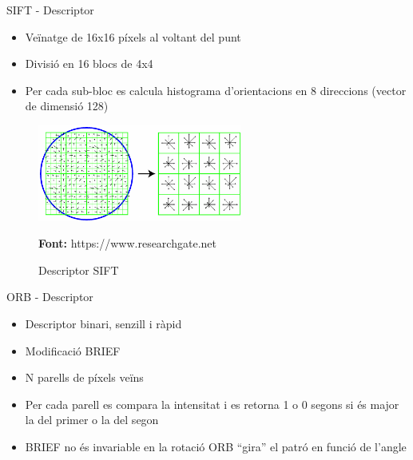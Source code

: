 \documentclass[xcolor=table, 11pt]{beamer}
\newcommand*{\captionsource}[2]{%
  \caption[{#1}]{#1}\par
  \vspace{-0.4cm}
  \tiny{\textbf{Font:} #2\par}}
\newcommand\tz{\fontsize{13}{15.6}\selectfont}
\begin{document}
	\begin{frame}{SIFT - Descriptor}
		\tz
		\begin{itemize}
			\item Veïnatge de 16x16 píxels al voltant del punt
			\item Divisió en 16 blocs de 4x4
			\item Per cada sub-bloc es calcula histograma d'orientacions en 8 direccions (vector de dimensió 128)
		\end{itemize}
		\begin{figure}[H]
			\centering
			\includegraphics[width=0.6\textwidth]{images/sift-des}
			\captionsource{Descriptor SIFT}{https://www.researchgate.net}
		\end{figure}
	\end{frame}

	\begin{frame}{ORB - Descriptor}
		\tz
		\begin{itemize}
			\item Descriptor binari, senzill i ràpid
			\item Modificació BRIEF\cite{Calonder:2010:BBR:1888089.1888148}
			\item N parells de píxels veïns
			\item Per cada parell es compara la intensitat i es retorna 1 o 0 segons si és major la del primer o la del segon
			\item \alert{BRIEF no és invariable en la rotació} \textrightarrow{} ORB ``gira'' el patró en funció de l'angle
		\end{itemize}
	\end{frame}
\end{document}

